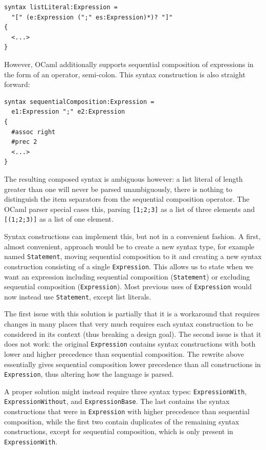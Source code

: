 \documentclass{kththesis}
\begin{document}
\begin{verbatim}
syntax listLiteral:Expression =
  "[" (e:Expression (";" es:Expression)*)? "]"
{
  <...>
}
\end{verbatim}

However, OCaml additionally supports sequential composition of expressions in the form of an operator, semi-colon. This syntax construction is also straight forward:

\begin{verbatim}
syntax sequentialComposition:Expression =
  e1:Expression ";" e2:Expression
{
  #assoc right
  #prec 2
  <...>
}
\end{verbatim}

The resulting composed syntax is ambiguous however: a list literal of length greater than one will never be parsed unambiguously, there is nothing to distinguish the item separators from the sequential composition operator. The OCaml parser special cases this, parsing \texttt{[1;2;3]} as a list of three elements and \texttt{[(1;2;3)]} as a list of one element.

Syntax constructions can implement this, but not in a convenient fashion. A first, almost convenient, approach would be to create a new syntax type, for example named \texttt{Statement}, moving sequential composition to it and creating a new syntax construction consisting of a single \texttt{Expression}. This allows us to state when we want an expression including sequential composition (\texttt{Statement}) or excluding sequential composition (\texttt{Expression}). Most previous uses of \texttt{Expression} would now instead use \texttt{Statement}, except list literals.

The first issue with this solution is partially that it is a workaround that requires changes in many places that very much requires each syntax construction to be considered in its context (thus breaking a design goal). The second issue is that it does not work: the original \texttt{Expression} contains syntax constructions with both lower and higher precedence than sequential composition. The rewrite above essentially gives sequential composition lower precedence than all constructions in \texttt{Expression}, thus altering how the language is parsed.

A proper solution might instead require three syntax types: \texttt{ExpressionWith}, \texttt{ExpressionWithout}, and \texttt{ExpressionBase}. The last contains the syntax constructions that were in \texttt{Expression} with higher precedence than sequential composition, while the first two contain duplicates of the remaining syntax constructions, except for sequential composition, which is only present in \texttt{ExpressionWith}.
\end{document}
